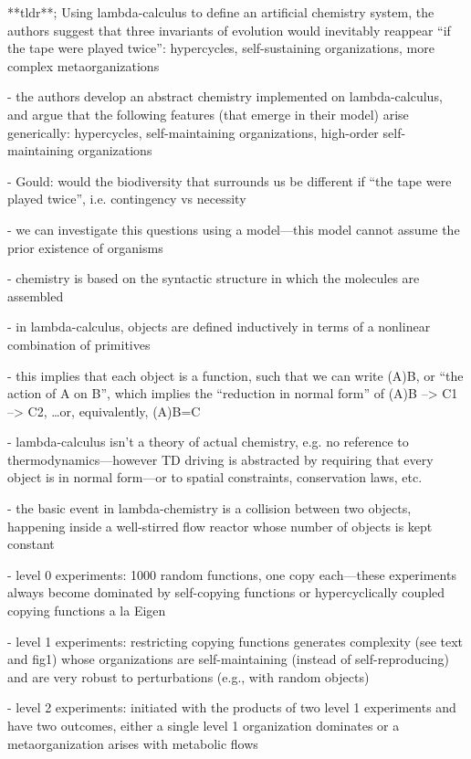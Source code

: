 \documentclass[11pt]{article}
\begin{document}
\begin{markdown}

**tldr**; Using lambda-calculus to define an artificial chemistry system, the authors suggest that three invariants of evolution would inevitably reappear “if the tape were played twice”: hypercycles, self-sustaining organizations, more complex metaorganizations

- the authors develop an abstract chemistry implemented on lambda-calculus, and argue that the following features (that emerge in their model) arise generically: hypercycles, self-maintaining organizations, high-order self-maintaining organizations
    
- Gould: would the biodiversity that surrounds us be different if “the tape were played twice”, i.e. contingency vs necessity
    
- we can investigate this questions using a model—this model cannot assume the prior existence of organisms
    
- chemistry is based on the syntactic structure in which the molecules are assembled
    
- in lambda-calculus, objects are defined inductively in terms of a nonlinear combination of primitives
    
- this implies that each object is a function, such that we can write (A)B, or “the action of A on B”, which implies the “reduction in normal form” of (A)B --> C1 --> C2, …or, equivalently, (A)B=C
    
- lambda-calculus isn’t a theory of actual chemistry, e.g. no reference to thermodynamics—however TD driving is abstracted by requiring that every object is in normal form—or to spatial constraints, conservation laws, etc.
    
- the basic event in lambda-chemistry is a collision between two objects, happening inside a well-stirred flow reactor whose number of objects is kept constant
    
- level 0 experiments: 1000 random functions, one copy each—these experiments always become dominated by self-copying functions or hypercyclically coupled copying functions a la Eigen
    
- level 1 experiments: restricting copying functions generates complexity (see text and fig1) whose organizations are self-maintaining (instead of self-reproducing) and are very robust to perturbations (e.g., with random objects)
    
- level 2 experiments: initiated with the products of two level 1 experiments and have two outcomes, either a single level 1 organization dominates or a metaorganization arises with metabolic flows
    

\end{markdown}
\end{document}

